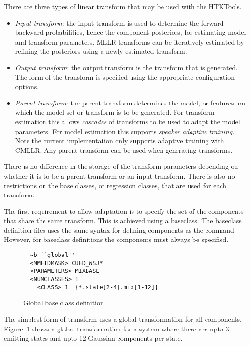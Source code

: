 There are three types of linear transform that may be used with 
the HTKTools.
\begin{itemize}

\item {\it Input transform}: the input transform is used to determine
the forward-backward probabilities, hence the component posteriors,
for estimating model and transform parameters. MLLR transforms can be
iteratively estimated by refining the posteriors using a newly
estimated transform.

\item {\it Output transform}: the output transform is the transform
that is generated. The form of the transform is specified using the 
appropriate configuration options.

\item {\it Parent transform}: the parent transform determines the 
model, or features, on which the model set or transform is to be 
generated. For transform estimation this allows {\em cascades} of transforms
to be used to adapt the model parameters. For model estimation this 
supports {\em speaker adaptive training}. Note the current implementation 
only supports adaptive training with CMLLR. Any parent transform can be
used when generating transforms.
\end{itemize}

There is no difference in the storage of the transform parameters depending
on whether it is to be a parent transform or an input transform. There is
also no restrictions on the base classes, or regression classes, that 
are used for each transform.

The first requirement to allow adaptation is to specify the set of
the components that share the same transform. This is achieved using a
baseclass.  The baseclass definition files uses the same syntax for
defining components as the  command. However, for
baseclass definitions the components must always be specified.

\begin{figure}[htbp]
\begin{verbatim}
  ~b ``global''
  <MMFIDMASK> CUED_WSJ* 
  <PARAMETERS> MIXBASE
  <NUMCLASSES> 1
    <CLASS> 1  {*.state[2-4].mix[1-12]}      
\end{verbatim}
\caption{Global base class definition}
\label{fig:globbase}
\end{figure}
The simplest form of transform uses a global transformation for all
components.  Figure~\ref{fig:globbase} shows a global transformation
for a system where there are upto 3 emitting states and upto 12
Gaussian components per state.

